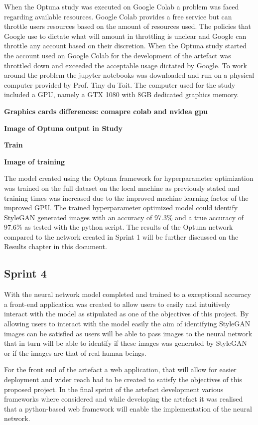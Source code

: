 When the Optuna study was executed on Google Colab a problem was faced regarding available resources. Google Colab provides a free service but can throttle users resources based on the amount of resources used. The policies that Google use to dictate what will amount in throttling is unclear and Google can throttle any account based on their discretion. When the Optuna study started the account used on Google Colab for the development of the artefact was throttled down and exceeded the acceptable usage dictated by Google. To work around the problem the jupyter notebooks was downloaded and run on a physical computer provided by Prof. Tiny du Toit. The computer used for the study included a GPU, namely a GTX 1080 with 8GB dedicated graphics memory.

\textbf{Graphics cards differences: comapre colab and nvidea gpu}

\textbf{Image of Optuna output in Study}

\textbf{Train}

\textbf{Image of training}

The model created using the Optuna framework for hyperparameter optimization was trained on the full dataset on the local machine as previously stated and training times was increased due to the improved  machine learning factor of the improved GPU. The trained hyperparameter optimized model could identify StyleGAN generated images with an accuracy of 97.3\% and a true accuracy of 97.6\% as tested with the python script. The results of the Optuna network compared to the network created in Sprint 1 will be further discussed on the Results chapter in this document.


\subsection{Sprint 4}

With the neural network model completed and trained to a exceptional accuracy a front-end application was created to allow users to easily and intuitively interact with the model as stipulated as one of the objectives of this project. By allowing users to interact with the model easily the aim of identifying StyleGAN images can be satisfied as users will be able to pass images to the neural network that in turn will be able to identify if these images was generated by StyleGAN or if the images are that of real human beings. 

For the front end of the artefact a web application, that will allow for easier deployment and wider reach had to be created to satisfy the objectives of this proposed project. In the final sprint of the artefact development various frameworks where considered and while developing the artefact it was realised that a python-based web framework will enable the implementation of the neural network. 

